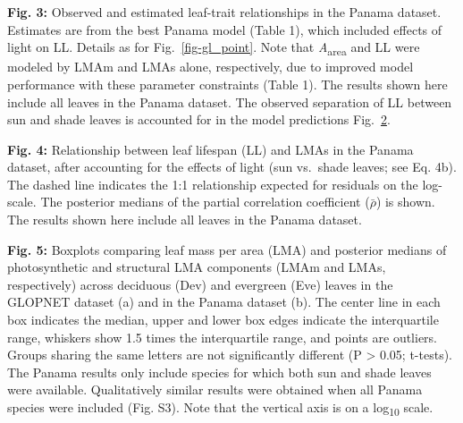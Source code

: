 \documentclass[
  12pt,
  letterpaper,
  DIV=11,
  numbers=noendperiod]{scrartcl}
\begin{document}
\begin{figure}

\centering{

}

\caption{\label{fig-pa_point}}

\end{figure}%

\textbf{Fig. 3:} Observed and estimated leaf-trait relationships in the
Panama dataset. Estimates are from the best Panama model (Table 1),
which included effects of light on LL. Details as for
Fig.~\ref{fig-gl_point}. Note that \emph{A}\textsubscript{area} and LL
were modeled by LMAm and LMAs alone, respectively, due to improved model
performance with these parameter constraints (Table 1). The results
shown here include all leaves in the Panama dataset. The observed
separation of LL between sun and shade leaves is accounted for in the
model predictions Fig.~\ref{fig-ll_point}.

\begin{figure}

\centering{

}

\caption{\label{fig-ll_point}}

\end{figure}%

\textbf{Fig. 4:} Relationship between leaf lifespan (LL) and LMAs in the
Panama dataset, after accounting for the effects of light (sun vs.~shade
leaves; see Eq. 4b). The dashed line indicates the 1:1 relationship
expected for residuals on the log-scale. The posterior medians of the
partial correlation coefficient (\(\bar{\rho}\)) is shown. The results
shown here include all leaves in the Panama dataset.

\begin{figure}

\centering{

}

\caption{\label{fig-box_de}}

\end{figure}%

\textbf{Fig. 5:} Boxplots comparing leaf mass per area (LMA) and
posterior medians of photosynthetic and structural LMA components (LMAm
and LMAs, respectively) across deciduous (Dev) and evergreen (Eve)
leaves in the GLOPNET dataset (a) and in the Panama dataset (b). The
center line in each box indicates the median, upper and lower box edges
indicate the interquartile range, whiskers show 1.5 times the
interquartile range, and points are outliers. Groups sharing the same
letters are not significantly different (P \textgreater{} 0.05;
t-tests). The Panama results only include species for which both sun and
shade leaves were available. Qualitatively similar results were obtained
when all Panama species were included (Fig. S3). Note that the vertical
axis is on a log\textsubscript{10} scale.
\end{document}
